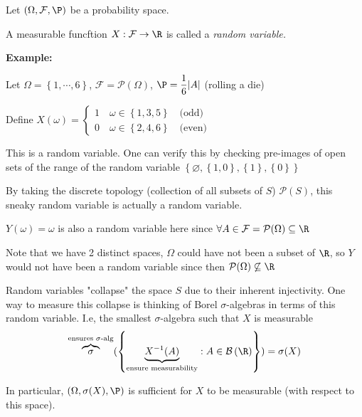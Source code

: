 \par\bigskip
\begin{defo}{}
  Let $(\Omega, \mathcal{F}, \P)$ be a probability space.\par
  \noindent A measurable funcftion $X:\mathcal{F}\to\R$ is called a \textit{random variable.}
\end{defo}
\par\bigskip
\noindent\textbf{Example:}\par
\noindent Let $\Omega = \left\{1,\cdots,6\right\}$, $\mathcal{F} = \mathcal{P}(\Omega)$, $\P = \dfrac{1}{6}|A|$ (rolling a die)\par
\noindent Define $X(\omega)=\begin{cases}1\quad\omega\in \left\{1,3,5\right\}\quad\text{(odd)}\\0\quad\omega\in\left\{2,4,6\right\}\quad\text{(even)}\end{cases}$\par
\noindent This is a random variable. One can verify this by checking pre-images of open sets of the range of the random variable $\left\{\varnothing,\left\{1,0\right\}, \left\{1\right\}, \left\{0\right\}\right\}$\par
\noindent By taking the discrete topology (collection of all subsets of $S$) $\mathcal{P}(S)$, this sneaky random variable is actually a random variable.\par
\noindent $Y(\omega) = \omega$ is also a random variable here since $\forall A\in\mathcal{F} = \mathcal{P}(\Omega)\subseteq\R$\par
\noindent Note that we have 2 distinct spaces, $\Omega$ could have not been a subset of $\R$, so $Y$ would not have been a random variable since then $\mathcal{P}(\Omega)\not\subseteq\R$
\par\bigskip
\noindent Random variables "collapse" the space $S$ due to their inherent injectivity. One way to measure this collapse is thinking of Borel $\sigma$-algebras in terms of this random variable. I.e, the smallest $\sigma$-algebra such that $X$ is measurable
\begin{equation*}
  \begin{gathered}
    \overbrace{\sigma}^{\text{ensures $\sigma$-alg}}(\left\{\underbrace{X^{-1}(A)}_{\text{ensure measurability}}:A\in\mathcal{B}\left(\R\right)\right\}) = \sigma(X)
  \end{gathered}
\end{equation*}
\par\bigskip
\noindent In particular, $(\Omega, \sigma(X), \P)$ is sufficient for $X$ to be measurable (with respect to this space).
